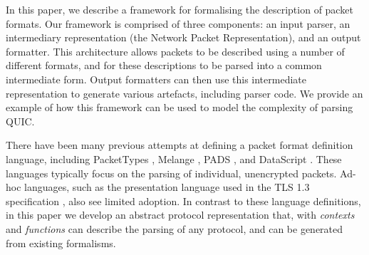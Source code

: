 \documentclass[10pt,sigconf]{acmart}
\begin{document}

In this paper, we describe a framework for formalising the description of packet formats.
Our framework is comprised of three components: an input parser, an intermediary
representation (the Network Packet Representation), and an output formatter. This
architecture allows packets to be described using a number of different formats, and for
these descriptions to be parsed into a common intermediate form. Output formatters can then
use this intermediate representation to generate various artefacts, including parser code.
We provide an example of how this framework can be used to model the complexity of parsing
QUIC.


There have been many previous attempts at defining a packet format definition language,
including PacketTypes \cite{mccann2000packet}, Melange \cite{madhavapeddy2007melange},
PADS \cite{fisher2005pads}, and DataScript \cite{back2002datascript}. These languages
typically focus on the parsing of individual, unencrypted packets. Ad-hoc languages, such
as the presentation language used in the TLS 1.3 specification
\cite{draft-ietf-tls-tls13-28}, also see limited adoption. In contrast to these language
definitions, in this paper we develop an abstract protocol representation that, with
\emph{contexts} and \emph{functions} can describe the parsing of any protocol, and can be
generated from existing formalisms.

\end{document}
